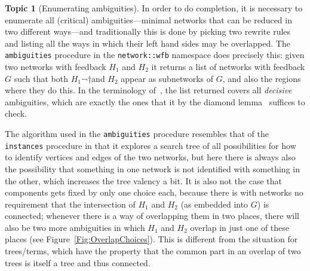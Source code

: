 \documentclass{article}
\theoremstyle{definition}
\newtheorem{topic}{Topic}
\begin{document}
\begin{topic}[Enumerating ambiguities]
  In order to do completion, it is necessary to enumerate all 
  (critical) ambiguities---minimal networks that can be reduced in 
  two different ways---and traditionally this is done by picking two 
  rewrite rules and listing all the ways in which their left hand 
  sides may be overlapped. The \texttt{ambiguities} procedure in the 
  \texttt{network::wfb} namespace does precisely this: given two 
  networks with feedback $H_1$ and $H_2$ it returns a list of 
  networks with feedback $G$ such that both $H_1$¬†and $H_2$ appear as 
  subnetworks of $G$, and also the regions where they do this. In the 
  terminology of~\cite{NR1}, the list returned covers all 
  \emph{decisive} ambiguities, which are exactly the ones that it 
  by the diamond lemma~\cite[Th.~10.24]{NR1} suffices to check.
  
  The algorithm used in the \texttt{ambiguities} procedure resembles 
  that of the \texttt{instances} procedure in that it explores a 
  search tree of all possibilities for how to identify vertices and 
  edges of the two networks, but here there is always also the 
  possibility that something in one network is not identified with 
  something in the other, which increases the tree valency a bit. It 
  is also not the case that components gets fixed by only one choice 
  each, because there is with networks no requirement that the 
  intersection of $H_1$ and $H_2$ (as embedded into $G$) is 
  connected; whenever there is a way of overlapping them in two 
  places, there will also be two more ambiguities in which $H_1$ and 
  $H_2$ overlap in just one of these places (see 
  Figure~\ref{Fig:OverlapChoices}). This is different from 
  the situation for trees\slash terms, which have the property that 
  the common part in an overlap of two trees is itself a tree and 
  thus connected.
  

\end{topic}
\end{document}
